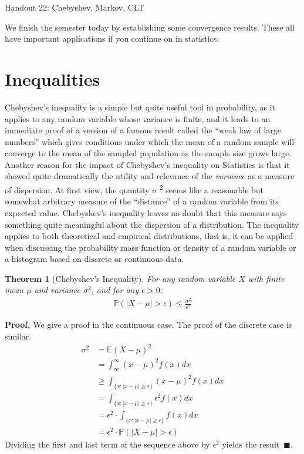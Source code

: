 \documentclass{tufte-handout}
\newtheorem{thm}{Theorem}
\begin{document}
\justify

{\LARGE Handout 22: Chebyshev, Markov, CLT}

\vspace*{18pt}

\noindent

We finish the semester today by establishing some convergence results.
These all have important applications if you continue on in statistics.

\section*{Inequalities}

Chebyshev's inequality is a simple but quite
useful tool in probability, as it applies to any random variable whose
variance is finite, and it leads to an immediate proof of a version of a
famous result called the ``weak law of large numbers'' which gives
conditions under which the mean of a random sample will converge to the
mean of the sampled population as the sample size grows large. Another
reason for the impact of Chebyshev's inequality on Statistics is that it
showed quite dramatically the utility and relevance of the
\emph{variance} as a measure of dispersion. At first view, the quantity
$\sigma$ \textsuperscript{2} seems like a reasonable but somewhat arbitrary
measure of the ``distance'' of a random variable from its expected
value. Chebyshev's inequality leaves no doubt that this measure says
something quite meaningful about the dispersion of a distribution. The
inequality applies to both theoretical and empirical distributions, that
is, it can be applied when discussing the probability mass function or
density of a random variable or a histogram based on discrete or
continuous data.

\begin{thm}[Chebyshev's Inequality]
For any random variable $X$ with finite
mean $\mu$ and variance $\sigma^2$, and for any $\epsilon > 0$:
\begin{align*}
\mathbb{P}\left( |X - \mu| > \epsilon \right) \leq \frac{\sigma^2}{\epsilon^2}
\end{align*}
\end{thm}
\textbf{Proof.} We give a proof in the continuous case. The proof of the
discrete case is similar.
\begin{align*}
\sigma^2 &= \mathbb{E} (X - \mu)^2 \\
&= \int_{\infty}^\infty (x - \mu)^2 f(x) dx \\
&\geq \int_{\{x: |x - \mu| \geq \epsilon \}} (x - \mu)^2 f(x) dx \\
&= \int_{\{x: |x - \mu| \geq \epsilon \}} \epsilon^2 f(x) dx \\
&= \epsilon^2 \cdot \int_{\{x: |x - \mu| \geq \epsilon \}} f(x) dx \\
&= \epsilon^2 \cdot \mathbb{P} \left( |X - \mu| > \epsilon \right)
\end{align*}
Dividing the first and last term of the sequence above by $\epsilon^2$
yields the result~$\blacksquare$.
\end{document}
